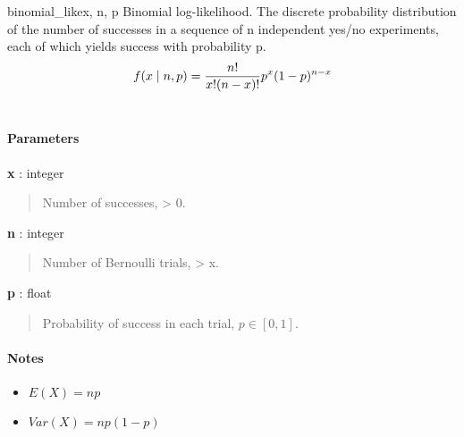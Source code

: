 \hypertarget{pymc.distributions.binomial_like}{}
\begin{funcdesc}{binomial\_like}{x, n, p}
Binomial log-likelihood.  The discrete probability distribution of the
number of successes in a sequence of n independent yes/no experiments,
each of which yields success with probability p.
\begin{gather}
\begin{split}f(x \mid n, p) = \frac{n!}{x!(n-x)!} p^x (1-p)^{n-x}\end{split}\notag\\\begin{split}\end{split}\notag
\end{gather}
\paragraph{Parameters}
\begin{paramlist}
\item[] \textbf{x} : integer
\begin{quote}

Number of successes, \textgreater{} 0.
\end{quote}

\item[]  \textbf{n} : integer
\begin{quote}

Number of Bernoulli trials, \textgreater{} x.
\end{quote}

\item[] \textbf{p} : float
\begin{quote}

Probability of success in each trial, $p \in [0,1]$.
\end{quote}
\end{paramlist}
\paragraph{Notes}
\begin{itemize}
\item {} 
$E(X)=np$

\item {} 
$Var(X)=np(1-p)$

\end{itemize}
\end{funcdesc}


